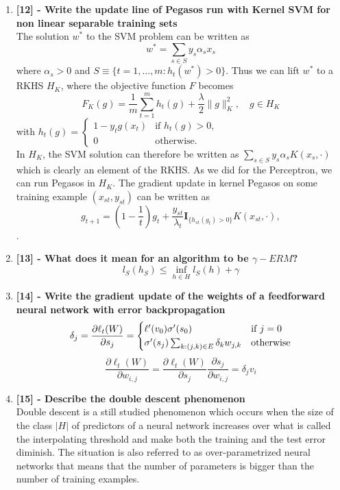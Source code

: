 \documentclass[a4paper]{report}
\begin{document}
\begin{enumerate}
    \item \textbf{[12] - Write the update line of Pegasos run with Kernel SVM for non linear separable training sets}\\
The solution $w^*$ to the SVM problem can be written as
\[
w^* = \sum_{s \in S} y_s \alpha_s x_s
\]
where $\alpha_s > 0$ and $S \equiv \{t = 1, \ldots, m : h_t(w^*) > 0\}$. Thus we can lift $w^*$ to a RKHS $H_K$, where the objective function $F$ becomes
\[
F_K(g) = \frac{1}{m} \sum_{t=1}^{m} h_t(g) + \frac{\lambda}{2} \|g\|_K^2, \quad g \in H_K
\]
with $h_t(g) = \begin{cases}
1 - y_t g(x_t) & \text{if } h_t(g) > 0, \\
0 & \text{otherwise}.
\end{cases}$ \\
In $H_K$, the SVM solution can therefore be written as
$\sum_{s \in S} y_s \alpha_s K(x_s, \cdot)$ which is clearly an element of the RKHS.
As we did for the Perceptron, we can run Pegasos in $H_K$. The gradient update in kernel Pegasos on some training example $(x_{st}, y_{st})$ can be written as
\[
g_{t+1} = \left(1 - \frac{1}{t}\right) g_t + \frac{y_{st}}{\lambda_t} \mathbf{I}_{\{h_{st}(g_t) > 0\}} K(x_{st}, \cdot),
\].
    \item \textbf{[13] - What does it mean for an algorithm to be $\gamma-ERM$?}\\
    \[l_S (h_S) \leq \inf_{h \in H}l_S (h) + \gamma\]
    \item \textbf{[14] - Write the gradient update of the weights of a feedforward neural network with error backpropagation}\\
    \[\delta_j = \frac{\partial\ell_t(W)}{\partial s_j} \\
    = \begin{cases}
    \ell'(v_0) \sigma'(s_0) & \text{if } j = 0 \\
    \sigma'(s_j) \sum_{k : (j,k) \in E} \delta_k w_{j,k} &  \text{otherwise}
    \end{cases} \]
    \[\frac{\partial\ell_t(W)}{\partial w_{i,j}} =  \frac{\partial\ell_t(W)}{\partial s_j} \frac{\partial    s_j}{\partial w_{i,j}} = \delta_j v_i\] 
    \item \textbf{[15] - Describe the double descent phenomenon}\\
    Double descent is a still studied phenomenon which occurs when the size of the class $|H|$ of predictors of a neural network increases over what is called the interpolating threshold and make both the training and the test error diminish. The situation is also referred to as over-parametrized neural networks that means that the number of parameters is bigger than the number of training examples.

\end{enumerate}
\end{document}
